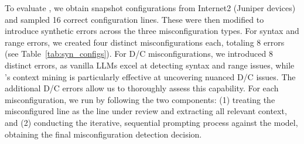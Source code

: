 




To evaluate \sysname{}, we obtain snapshot configurations from Internet2 (Juniper devices) and sampled 16 correct configuration lines. These were then modified to introduce synthetic errors across the three misconfiguration types. For syntax and range errors, we created four distinct misconfigurations each, totaling 8 errors (see Table~\ref{tab:syn_configs}). For D/C misconfigurations, we introduced 8 distinct errors, as vanilla LLMs excel at detecting syntax and range issues, while \sysname{}’s context mining is particularly effective at uncovering nuanced D/C issues. The additional D/C errors allow us to thoroughly assess this capability.
For each misconfiguration, we run \sysname{} by following the two components: (1) treating the misconfigured line as the line under review and extracting all relevant context, and (2) conducting the iterative, sequential prompting process against the model, obtaining the final misconfiguration detection decision.

